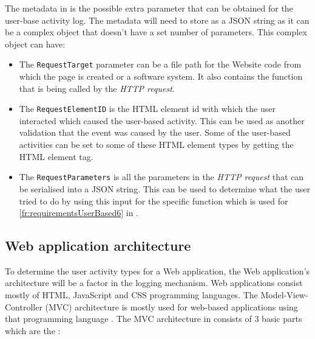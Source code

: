 The metadata in  is the possible extra parameter that can be obtained for the user-base activity log. The metadata will need to store as a JSON string as it can be a complex object that doesn't have a set number of parameters. This complex object can have:

\begin{itemize}
	\item The \texttt{RequestTarget} parameter can be a file path for the Website code from which the page is created or a software system. It also contains the function that is being called by the \textit{HTTP request}.
	\item The \texttt{RequestElementID} is the HTML element id with which the user interacted which caused the user-based activity. This can be used as another validation that the event was caused by the user. Some of the user-based activities can be set to some of these HTML element types by getting the HTML element tag.
	\item The \texttt{RequestParameters} is all the parameters in the \textit{HTTP request} that can be serialised into a JSON string. This can be used to determine what the user tried to do by using this input for the specific function which is used for \ref{fr:requirementsUserBased6} in .
\end{itemize}

\subsection{Web application architecture}\label{sec:ch2_webApplicationArchitecture}
To determine the user activity types for a Web application, the Web application's architecture will be a factor in the logging mechanism. Web applications consist mostly of HTML, JavaScript and CSS programming languages. The Model-View-Controller (MVC) architecture is mostly used for web-based applications using that programming language \cite{Jailia2016}. The MVC architecture in  consists of 3 basic parts which are the \cite{Jailia2016}:

